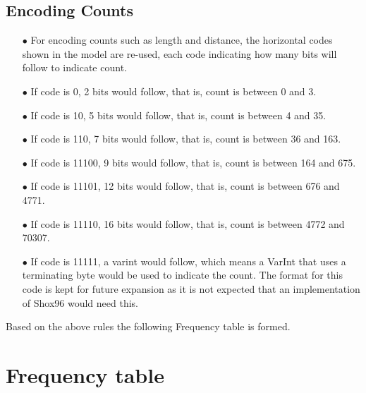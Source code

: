 \documentclass[]{article}
\begin{document}
\subsection{Encoding Counts}
\begin{itemize}
	\item[$\bullet$] For encoding counts such as length and distance, the horizontal codes shown in the model are re-used, each code indicating how many bits will follow to indicate count.
	\item[$\bullet$] If code is 0, 2 bits would follow, that is, count is between 0 and 3.
	\item[$\bullet$] If code is 10, 5 bits would follow, that is, count is between 4 and 35.
	\item[$\bullet$] If code is 110, 7 bits would follow, that is, count is between 36 and 163.
	\item[$\bullet$] If code is 11100, 9 bits would follow, that is, count is between 164 and 675.
	\item[$\bullet$] If code is 11101, 12 bits would follow, that is, count is between 676 and 4771.
	\item[$\bullet$] If code is 11110, 16 bits would follow, that is, count is between 4772 and 70307.
	\item[$\bullet$] If code is 11111, a varint would follow, which means a VarInt that uses a terminating byte would be used to indicate the count.  The format for this code is kept for future expansion as it is not expected that an implementation of Shox96 would need this.
\end{itemize}

Based on the above rules the following Frequency table is formed.

\section{Frequency table}
\end{document}

